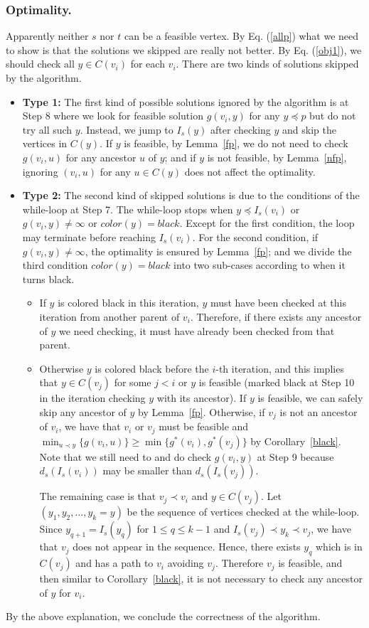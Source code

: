 \subsubsection*{Optimality.}
Apparently neither $s$ nor $t$ can be a feasible vertex.
By Eq. (\ref{allp}) what we need to show is that the solutions we skipped are really not better.
By Eq. (\ref{obj1}), we should check all $y\in C(v_i)$ for each $v_i$.
There are two kinds of solutions skipped by the algorithm.
\begin{itemize}
\item {\bf Type 1:}
The first kind of possible solutions ignored by the algorithm is at Step 8 where we look for feasible solution $g(v_i,y)$ for any $y\preceq p$ but do not try all such $y$. Instead, we jump to $I_s(y)$ after checking $y$ and skip the vertices in $C(y)$.
If $y$ is feasible, by Lemma~\ref{fp}, we do not need to check $g(v_i,u)$ for any ancestor $u$ of $y$; and if 
$y$ is not feasible, by Lemma~\ref{nfp}, ignoring $(v_i,u)$ for any $u\in C(y)$ does not affect the optimality.

\item {\bf Type 2:} The second kind of skipped solutions is due to the conditions of the while-loop at Step 7.
The while-loop stops when $y\preceq I_s(v_i)$ or $g(v_i,y)\neq \infty$ or $color(y)=black$.
Except for the first condition, the loop may terminate before reaching $I_s(v_i)$.
For the second condition, if $g(v_i,y)\neq \infty$, the optimality is ensured by Lemma~\ref{fp}; and 
we divide the third condition $color(y)=black$ into two sub-cases according to when it turns black. 
\begin{itemize}
\item If $y$ is colored black in this iteration, $y$ must have been checked at this iteration from another parent of $v_i$. Therefore, if there exists any ancestor of $y$ we need checking, it must have already been checked from that parent. 
\item Otherwise $y$ is colored black before the $i$-th iteration, and this implies that $y\in C(v_j)$ for some $j<i$ or $y$ is feasible (marked black at Step 10 in the iteration checking $y$ with its ancestor). If $y$ is feasible, we can safely skip any ancestor of $y$ by Lemma~\ref{fp}. Otherwise, if $v_j$ is not an ancestor of $v_i$, we have that $v_i$ or $v_j$ must be feasible and $\min_{u\prec y}\{g(v_i,u)\}\geq \min\{g^*(v_i),g^*(v_j)\}$ by Corollary~\ref{black}. Note that we still need to and do check $g(v_i,y)$ at Step 9 because $d_s(I_s(v_i))$ may be smaller than $d_s(I_s(v_j))$. 

The remaining case is that $v_j\prec v_i$ and $y\in C(v_j)$.
Let $(y_1, y_2,\ldots ,y_k=y)$ be the sequence of vertices checked at the while-loop.
Since $y_{q+1}=I_s(y_q)$ for $1\leq q\leq k-1$ and $I_s(v_j)\prec y_k\prec v_j$, we have that $v_j$ does not appear in the sequence. Hence, there exists $y_q$ which is in $C(v_j)$ and has a path to $v_i$ avoiding $v_j$.
Therefore $v_j$ is feasible, 
and then similar to Corollary~\ref{black}, it is not necessary to check any ancestor of $y$ for $v_i$.  
\end{itemize}
\end{itemize}
By the above explanation, we conclude the correctness of the algorithm. 

